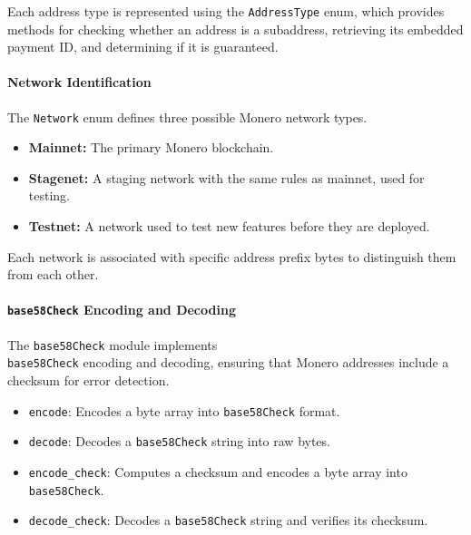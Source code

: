 \documentclass[12pt,a4paper]{article}
\begin{document}
Each address type is represented using the \texttt{AddressType} enum, which provides methods for checking whether an address is a subaddress, retrieving its embedded payment ID, and determining if it is guaranteed. %

\paragraph{Network Identification}

The \texttt{Network} enum defines three possible Monero network types.

\begin{itemize}
    \item \textbf{Mainnet:} The primary Monero blockchain.
    \item \textbf{Stagenet:} A staging network with the same rules as mainnet, used for testing.
    \item \textbf{Testnet:} A network used to test new features before they are deployed.
\end{itemize}

Each network is associated with specific address prefix bytes to distinguish them from each other. %

\paragraph{\texttt{base58Check} Encoding and Decoding}

The \texttt{base58Check} module implements \\ \texttt{base58Check} encoding and decoding, ensuring that Monero addresses include a checksum for error detection. %

\begin{itemize}
    \item \texttt{encode}: Encodes a byte array into \texttt{base58Check} format.
    \item \texttt{decode}: Decodes a \texttt{base58Check} string into raw bytes.
    \item \texttt{encode\_check}: Computes a checksum and encodes a byte array into \texttt{base58Check}.
    \item \texttt{decode\_check}: Decodes a \texttt{base58Check} string and verifies its checksum.
\end{itemize}
\end{document}
